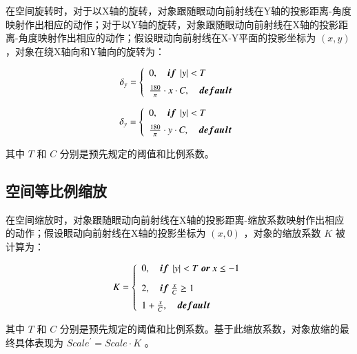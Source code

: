 在空间旋转时，对于以X轴的旋转，对象跟随眼动向前射线在Y轴的投影距离-角度映射作出相应的动作；对于以Y轴的旋转，对象跟随眼动向前射线在X轴的投影距离-角度映射作出相应的动作；假设眼动向前射线在X-Y平面的投影坐标为 $(x, y)$ ，对象在绕X轴向和Y轴向的旋转为：

\begin{equation}
	\label{formula-3-5}
	\delta_y = 
    \left\{
    \begin{array}{l}
        0, \quad {\mbox{\boldmath $if$}}\ \left|y\right| < T \\ [0.2cm]
        \frac{180}{\pi} \cdot x \cdot C,\quad {\mbox{\boldmath $default$}}
    \end{array}
    \right.
\end{equation}
 
\begin{equation}
	\label{formula-3-6}
	\delta_y = 
    \left\{
    \begin{array}{l}
        0, \quad {\mbox{\boldmath $if$}}\ \left|y\right| < T \\ [0.2cm]
        \frac{180}{\pi} \cdot y \cdot C,\quad {\mbox{\boldmath $default$}}
    \end{array}
    \right.
\end{equation}

其中 $T$ 和 $C$ 分别是预先规定的阈值和比例系数。

\subsection{空间等比例缩放}

在空间缩放时，对象跟随眼动向前射线在X轴的投影距离-缩放系数映射作出相应的动作；假设眼动向前射线在X轴的投影坐标为 $(x, 0)$ ，对象的缩放系数 $K$ 被计算为：

\begin{equation}
	\label{formula-3-7}
	K = 
    \left\{
    \begin{array}{l}
        0, \quad {\mbox{\boldmath $if$}}\ \left|y\right| < T\ {\mbox{\boldmath $or$}}\ x \le -1 \\ [0.3cm]
        2, \quad {\mbox{\boldmath $if$}}\ \frac{x}{C} \ge 1 \\ [0.2cm]
        1 + \frac{x}{C},\quad {\mbox{\boldmath $default$}}
    \end{array}
    \right.
\end{equation}

其中 $T$ 和 $C$ 分别是预先规定的阈值和比例系数。基于此缩放系数，对象放缩的最终具体表现为 $Scale^\prime = Scale \cdot K$ 。

